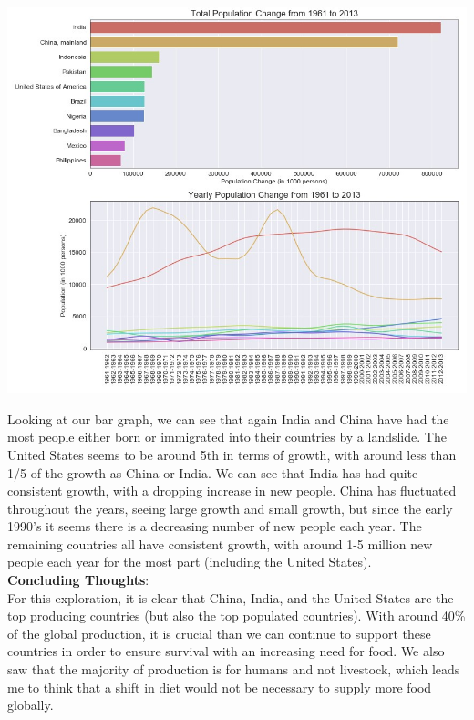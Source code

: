 \documentclass[12pt, a4paper]{article}
\begin{document}
\begin{spacing}{1.1}

	\begin{center}
	\includegraphics[scale=.65]{pop_change} 
	\end{center}
	Looking at our bar graph, we can see that again India and China have had the most people either born or immigrated into their countries by a landslide. The United States seems to be around 5th in terms of growth, with around less than 1/5 of the growth as China or India. We can see that India has had quite consistent growth, with a dropping increase in new people. China has fluctuated throughout the years, seeing large growth and small growth, but since the early 1990's it seems there is a decreasing number of new people each year. The remaining countries all have consistent growth, with around 1-5 million new people each year for the most part (including the United States). \vspace*{6mm}\\
	\textbf{Concluding Thoughts}:\\
	For this exploration, it is clear that China, India, and the United States are the top producing countries (but also the top populated countries). With around 40\% of the global production, it is crucial than we can continue to support these countries in order to ensure survival with an increasing need for food. We also saw that the majority of production is for humans and not livestock, which leads me to think that a shift in diet would not be necessary to supply more food globally. \newpage


\end{spacing}
\end{document}
